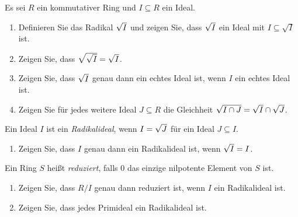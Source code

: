 \begin{question}
  \label{question: radical ideals}
  Es sei $R$ ein kommutativer Ring und $I \subseteq R$ ein Ideal.
  \begin{enumerate}
    \item
      Definieren Sie das Radikal $\sqrt{I}$ und zeigen Sie, dass $\sqrt{I}$ ein Ideal mit $I \subseteq \sqrt{I}$ ist.
    \item
      Zeigen Sie, dass $\sqrt{\sqrt{I}} = \sqrt{I}$.
    \item
      Zeigen Sie, dass $\sqrt{I}$ genau dann ein echtes Ideal ist, wenn $I$ ein echtes Ideal ist.
    \item
      Zeigen Sie für jedes weitere Ideal $J \subseteq R$ die Gleichheit $\sqrt{I \cap J} = \sqrt{I} \cap \sqrt{J}$.
  \end{enumerate}
  Ein Ideal $I$ ist ein \emph{Radikalideal}, wenn $I = \sqrt{J}$ für ein Ideal $J \subseteq I$.
  \begin{enumerate}[resume]
    \item
      Zeigen Sie, dass $I$ genau dann ein Radikalideal ist, wenn $\sqrt{I} = I$.
  \end{enumerate}
  Ein Ring $S$ heißt \emph{reduziert}, falls $0$ das einzige nilpotente Element von $S$ ist.
  \begin{enumerate}[resume]
    \item
      Zeigen Sie, dass $R/I$ genau dann reduziert ist, wenn $I$ ein Radikalideal ist.
    \item
      Zeigen Sie, dass jedes Primideal ein Radikalideal ist.
  \end{enumerate}
\end{question}


